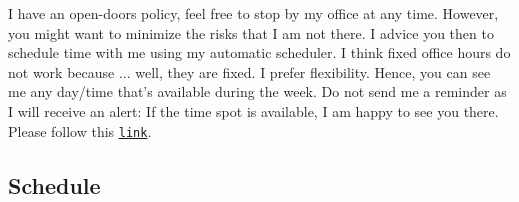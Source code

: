 \documentclass[letterpaper]{article}
\renewenvironment{itemize}{
  \begin{list}{}{
    \setlength{\leftmargin}{1.5em}
  }
}{
  \end{list}
}
\begin{document}
I have an open-doors policy, feel free to stop by my office at any time. However, you might want to minimize the risks that I am not there. I advice you then to schedule time with me using my automatic scheduler. I think fixed office hours do not work because ... well, they are fixed. I prefer flexibility. Hence, you can see me any day/time that's available during the week. Do not send me a reminder as I will receive an alert: If the time spot is available, I am happy to see you there. Please follow this \href{https://calendly.com/bahamonde/officehours}{\texttt{link}}.



%
%
%


\subsection*{Schedule}
\end{document}
